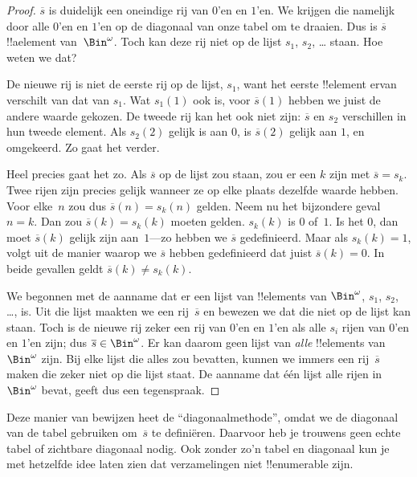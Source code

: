 \documentclass[../../../include/open-logic-section]{subfiles}
\begin{document}
\begin{proof}
$\overline{s}$ is duidelijk een oneindige rij van $0$'en en $1$'en.
We krijgen die namelijk door alle $0$'en en $1$'en op de diagonaal van
onze tabel om te draaien. Dus is $\overline{s}$ !!a{element}
van~$\Bin^\omega$. Toch kan deze rij niet op de lijst $s_1$, $s_2$,
\dots{} staan. Hoe weten we dat?

De nieuwe rij is niet de eerste rij op de lijst, $s_1$, want het eerste
!!{element} ervan verschilt van dat van $s_1$. Wat $s_1(1)$ ook is,
voor $\overline{s}(1)$ hebben we juist de andere waarde gekozen. De
tweede rij kan het ook niet zijn: $\overline{s}$ en $s_2$ verschillen
in hun tweede element. Als $s_2(2)$ gelijk is aan $0$, is
$\overline{s}(2)$ gelijk aan $1$, en omgekeerd. Zo gaat het verder.

Heel precies gaat het zo. Als $\overline{s}$ op de lijst zou staan, zou
er een $k$ zijn met $\overline{s} = s_{k}$. Twee rijen zijn precies gelijk
wanneer ze op elke plaats dezelfde waarde hebben.
Voor elke~$n$ zou dus $\overline{s}(n) = s_{k}(n)$ gelden. Neem nu het
bijzondere geval $n = k$. Dan zou $\overline{s}(k) = s_{k}(k)$ moeten
gelden. $s_k(k)$ is $0$ of~$1$. Is het $0$, dan moet
$\overline{s}(k)$ gelijk zijn aan~$1$---zo hebben we $\overline{s}$
gedefinieerd. Maar als $s_k(k) = 1$, volgt uit de manier waarop we
$\overline{s}$ hebben gedefinieerd dat juist $\overline{s}(k) = 0$.
In beide gevallen geldt
$\overline{s}(k) \neq s_{k}(k)$.

We begonnen met de aanname dat er een lijst van !!{element}s van
$\Bin^\omega$, $s_1$, $s_2$, \dots{}, is. Uit die lijst maakten we een
rij~$\overline{s}$ en bewezen we dat die niet op de lijst kan staan.
Toch is de nieuwe rij zeker een rij van $0$'en en $1$'en als alle
$s_i$ rijen van $0$'en en $1$'en zijn; dus $\overline{s} \in
\Bin^\omega$. Er kan daarom geen lijst van \emph{alle} !!{element}s
van~$\Bin^\omega$ zijn. Bij elke lijst die alles zou bevatten, kunnen
we immers een rij~$\overline{s}$ maken die zeker niet op die lijst
staat. De aanname dat één lijst alle rijen in~$\Bin^\omega$ bevat,
geeft dus een tegenspraak.
\end{proof}

\begin{explain}
Deze manier van bewijzen heet de ``diagonaalmethode'', omdat we de
diagonaal van de tabel gebruiken om~$\overline{s}$ te definiëren.
Daarvoor heb je trouwens geen echte tabel of zichtbare diagonaal nodig.
Ook zonder zo'n tabel en diagonaal kun je met hetzelfde idee laten zien
dat verzamelingen niet !!{enumerable} zijn.
\end{explain}
\end{document}
